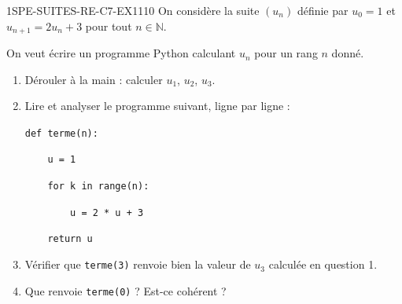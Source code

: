 


\begin{exercice}{1SPE-SUITES-RE-C7-EX1}{1}{10}
On considère la suite $(u_n)$ définie par $u_0 = 1$ et $u_{n+1} = 2u_n + 3$ pour tout $n \in \mathbb{N}$.

On veut écrire un programme Python calculant $u_n$ pour un rang $n$ donné.

\begin{enumerate}
  \item Dérouler à la main : calculer $u_1$, $u_2$, $u_3$.
  \item Lire et analyser le programme suivant, ligne par ligne :

\medskip
\verb|def terme(n):|

\verb|    u = 1|

\verb|    for k in range(n):|

\verb|        u = 2 * u + 3|

\verb|    return u|

  \item Vérifier que \texttt{terme(3)} renvoie bien la valeur de $u_3$ calculée en question 1.
  \item Que renvoie \texttt{terme(0)} ? Est-ce cohérent ?
\end{enumerate}
\end{exercice}


